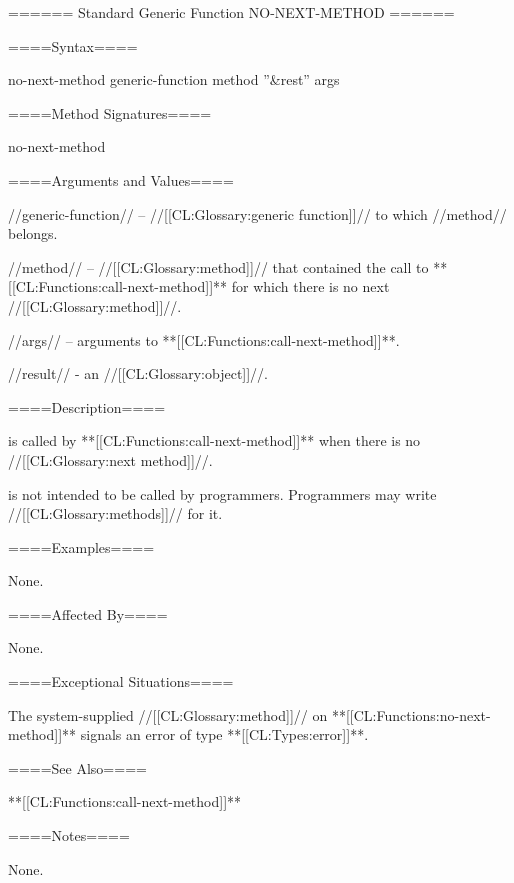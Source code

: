 ====== Standard Generic Function NO-NEXT-METHOD ======

====Syntax====

\DefgenWithValues no-next-method {generic-function method ''&rest'' args} {}

====Method Signatures====

\Defmeth no-next-method {}

====Arguments and Values====

//generic-function// -- //[[CL:Glossary:generic function]]// to which //method// belongs.

//method// -- //[[CL:Glossary:method]]// that contained the call to **[[CL:Functions:call-next-method]]** for which there is no next //[[CL:Glossary:method]]//.

//args// -- arguments to **[[CL:Functions:call-next-method]]**.

//result// - an //[[CL:Glossary:object]]//.

====Description====

 is called by **[[CL:Functions:call-next-method]]** when there is no //[[CL:Glossary:next method]]//.

 is not intended to be called by programmers. Programmers may write //[[CL:Glossary:methods]]// for it.

====Examples====

None.

====Affected By====

None.

====Exceptional Situations====

The system-supplied //[[CL:Glossary:method]]// on **[[CL:Functions:no-next-method]]** signals an error of type **[[CL:Types:error]]**. 

====See Also====

**[[CL:Functions:call-next-method]]**

====Notes====

None.


